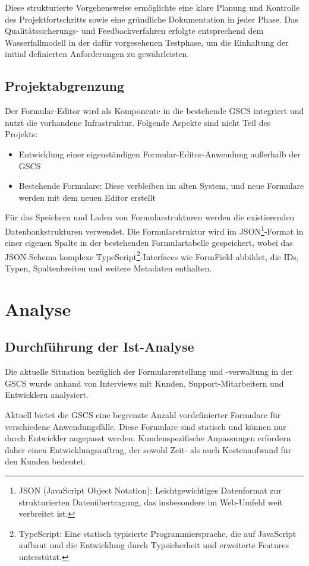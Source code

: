 \documentclass[a4paper,11pt]{article}
\begin{document}
\noindent Diese strukturierte Vorgehensweise ermöglichte eine klare Planung und Kontrolle des Projektfortschritts sowie eine gründliche Dokumentation in jeder Phase. Das Qualitätssicherungs- und Feedbackverfahren erfolgte entsprechend dem Wasserfallmodell in der dafür vorgesehenen Testphase, um die Einhaltung der initial definierten Anforderungen zu gewährleisten.

\subsection{Projektabgrenzung}
Der Formular-Editor wird als Komponente in die bestehende GSCS integriert und nutzt die vorhandene Infrastruktur. Folgende Aspekte sind nicht Teil des Projekts:

\begin{itemize}
  \item Entwicklung einer eigenständigen Formular-Editor-Anwendung außerhalb der GSCS
  \item Bestehende Formulare: Diese verbleiben im alten System, und neue Formulare werden mit dem neuen Editor erstellt
\end{itemize}

\noindent Für das Speichern und Laden von Formularstrukturen werden die existierenden Datenbankstrukturen verwendet. Die Formularstruktur wird im JSON\footnote{JSON (JavaScript Object Notation): Leichtgewichtiges Datenformat zur strukturierten Datenübertragung, das insbesondere im Web-Umfeld weit verbreitet ist.}-Format in einer eigenen Spalte in der bestehenden Formulartabelle gespeichert, wobei das JSON-Schema komplexe TypeScript\footnote{TypeScript: Eine statisch typisierte Programmiersprache, die auf JavaScript aufbaut und die Entwicklung durch Typsicherheit und erweiterte Features unterstützt.}-Interfaces wie FormField abbildet, die IDs, Typen, Spaltenbreiten und weitere Metadaten enthalten.


\section{Analyse}
\subsection{Durchführung der Ist-Analyse}
Die aktuelle Situation bezüglich der Formularerstellung und -verwaltung in der GSCS wurde anhand von Interviews mit Kunden, Support-Mitarbeitern und Entwicklern analysiert.

\noindent Aktuell bietet die GSCS eine begrenzte Anzahl vordefinierter Formulare für verschiedene Anwendungsfälle. Diese Formulare sind statisch und können nur durch Entwickler angepasst werden. Kundenspezifische Anpassungen erfordern daher einen Entwicklungsauftrag, der sowohl Zeit- als auch Kostenaufwand für den Kunden bedeutet.
\end{document}
